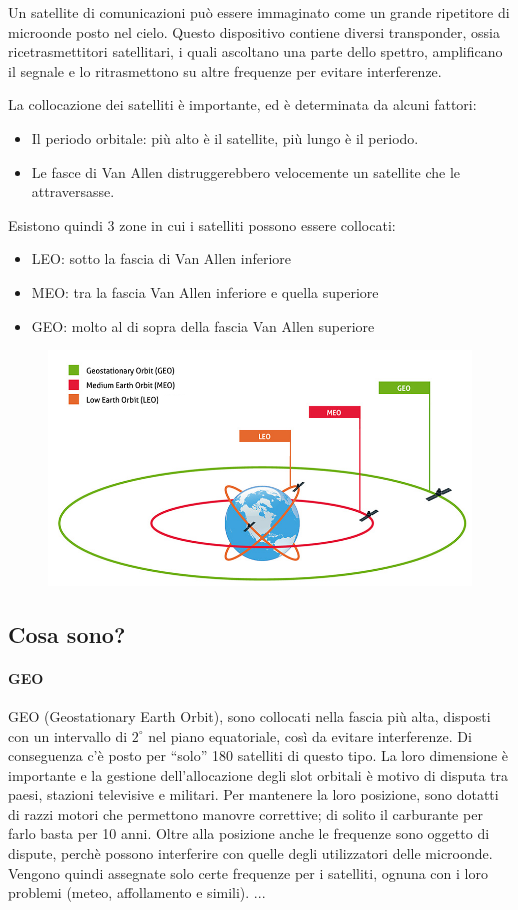 Un satellite di comunicazioni può essere immaginato come un grande ripetitore di microonde posto nel cielo.
Questo dispositivo contiene diversi transponder, ossia ricetrasmettitori satellitari, i quali ascoltano una parte dello spettro, amplificano il segnale e lo ritrasmettono su altre frequenze per evitare interferenze.

La collocazione dei satelliti è importante, ed è determinata da alcuni fattori:
\begin{itemize}
\item	Il periodo orbitale: più alto è il satellite, più lungo è il periodo.
\item	Le fasce di Van Allen distruggerebbero velocemente un satellite che le attraversasse.
\end{itemize}
Esistono quindi 3 zone in cui i satelliti possono essere collocati:
\begin{itemize}
\item LEO: sotto la fascia di Van Allen inferiore
\item MEO: tra la fascia Van Allen inferiore e quella superiore
\item GEO: molto al di sopra della fascia Van Allen superiore
\end{itemize}

\begin{figure}[H]
\centering
\includegraphics[scale=0.55]{res/img/4_satelliti.png}
\end{figure}
\subsection{Cosa sono?}
\paragraph{GEO}
GEO (Geostationary Earth Orbit), sono collocati nella fascia più alta, disposti con un intervallo di $2^{\circ}$ nel piano equatoriale,
così da evitare interferenze. Di conseguenza c’è posto per “solo” 180 satelliti di questo tipo. La loro dimensione è importante e
la gestione dell’allocazione degli slot orbitali è motivo di disputa tra paesi, stazioni televisive e militari.
Per mantenere la loro posizione, sono dotatti di razzi motori che permettono manovre correttive; di solito il carburante per farlo basta per 10 anni.
Oltre alla posizione anche le frequenze sono oggetto di dispute, perchè possono interferire con quelle degli utilizzatori delle microonde.
Vengono quindi assegnate solo certe frequenze per i satelliti, ognuna con i loro problemi (meteo, affollamento e simili).
...

